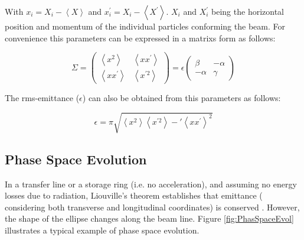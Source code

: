 With $x_{i} = X_{i} - \left< X \right>$ and $x^{'}_{i} = X_{i} - \left< X^{'}\right>$. $X_{i}$ and $X_{i}^{'}$ being the horizontal position and momentum of the individual particles conforming the beam. For convenience this parameters can be expressed in a matrixs form as follows: 

\begin{equation}
    \Sigma = 
    \begin{pmatrix}
        \left< x^{2} \right> & \left< x x^{'} \right> \\
        \left< x x^{'} \right> & \left< x^{' 2} \right>
    \end{pmatrix}
    = \epsilon 
    \begin{pmatrix}
        \beta & - \alpha \\ -\alpha  & \gamma
    \end{pmatrix}
\end{equation}

The rms-emittance ($\epsilon$) can also be obtained from this parameters as follows: 

\begin{equation}
    \epsilon = \pi \sqrt{\left<x^{2}\right>\left< x^{'2}\right> - '\left<x x^{'}\right>^{2}}
\end{equation}

\subsection{Phase Space Evolution}
\label{subsec:PhaseSpaceEvol}

In a transfer line or a storage ring (i.e. no acceleration), and assuming no energy losses due to radiation, Liouville's theorem establishes that emittance ( considering both transverse and longitudinal coordinates) is conserved \parencite*[][]{ref:EmittanceConserv}. However, the shape of the ellipse changes along the beam line. Figure \ref{fig:PhasSpaceEvol} illustrates a typical example of phase space evolution. 

